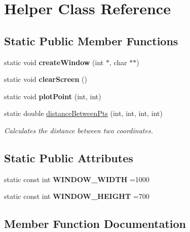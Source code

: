\hypertarget{class_helper}{}\section{Helper Class Reference}
\label{class_helper}
\subsection*{Static Public Member Functions}
\begin{DoxyCompactItemize}
\item 
\mbox{\label{class_helper_a0c737a761fc0e355cfbab843904b805b}} 
static void {\bfseries create\+Window} (int $\ast$, char $\ast$$\ast$)
\item 
\mbox{\label{class_helper_ae62e52c288fa71ecfeb463ba83a3e6a4}} 
static void {\bfseries clear\+Screen} ()
\item 
\mbox{\label{class_helper_adb93a220e5cadac68b1ef3f3ca36ecfe}} 
static void {\bfseries plot\+Point} (int, int)
\item 
static double \mbox{\hyperlink{class_helper_a1f032f9c09e6b31780be43afb43ddf28}{distance\+Between\+Pts}} (int, int, int, int)
\begin{DoxyCompactList}\small\item\em Calculates the distance between two coordinates. \end{DoxyCompactList}\end{DoxyCompactItemize}
\subsection*{Static Public Attributes}
\begin{DoxyCompactItemize}
\item 
\mbox{\label{class_helper_ad4164c542e99e3ef2ccdd49866fc35b8}} 
static const int {\bfseries W\+I\+N\+D\+O\+W\+\_\+\+W\+I\+D\+TH} =1000
\item 
\mbox{\label{class_helper_a92080f2e118c556e3b9629698c5ca896}} 
static const int {\bfseries W\+I\+N\+D\+O\+W\+\_\+\+H\+E\+I\+G\+HT} =700
\end{DoxyCompactItemize}


\subsection{Member Function Documentation}
\mbox{\label{class_helper_a1f032f9c09e6b31780be43afb43ddf28}} 
